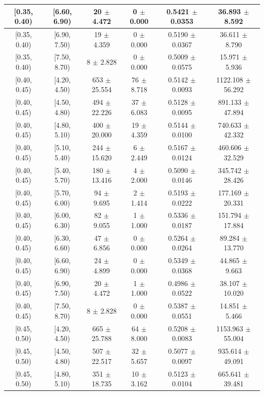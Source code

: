 \begin{longtable}{|c|c|c|c|c|c|}
\hline
[0.35, 0.40) & [6.60, 6.90) & 20 $\pm$ 4.472 & 0 $\pm$ 0.000 & 0.5421 $\pm$ 0.0353 & 36.893 $\pm$ 8.592 \\ 
\hline
[0.35, 0.40) & [6.90, 7.50) & 19 $\pm$ 4.359 & 0 $\pm$ 0.000 & 0.5190 $\pm$ 0.0367 & 36.611 $\pm$ 8.790 \\ 
\hline
[0.35, 0.40) & [7.50, 8.70) & 8 $\pm$ 2.828 & 0 $\pm$ 0.000 & 0.5009 $\pm$ 0.0575 & 15.971 $\pm$ 5.936 \\ 
\hline
[0.40, 0.45) & [4.20, 4.50) & 653 $\pm$ 25.554 & 76 $\pm$ 8.718 & 0.5142 $\pm$ 0.0093 & 1122.108 $\pm$ 56.292 \\ 
\hline
[0.40, 0.45) & [4.50, 4.80) & 494 $\pm$ 22.226 & 37 $\pm$ 6.083 & 0.5128 $\pm$ 0.0095 & 891.133 $\pm$ 47.894 \\ 
\hline
[0.40, 0.45) & [4.80, 5.10) & 400 $\pm$ 20.000 & 19 $\pm$ 4.359 & 0.5144 $\pm$ 0.0100 & 740.633 $\pm$ 42.332 \\ 
\hline
[0.40, 0.45) & [5.10, 5.40) & 244 $\pm$ 15.620 & 6 $\pm$ 2.449 & 0.5167 $\pm$ 0.0124 & 460.606 $\pm$ 32.529 \\ 
\hline
[0.40, 0.45) & [5.40, 5.70) & 180 $\pm$ 13.416 & 4 $\pm$ 2.000 & 0.5090 $\pm$ 0.0146 & 345.742 $\pm$ 28.426 \\ 
\hline
[0.40, 0.45) & [5.70, 6.00) & 94 $\pm$ 9.695 & 2 $\pm$ 1.414 & 0.5193 $\pm$ 0.0222 & 177.169 $\pm$ 20.331 \\ 
\hline
[0.40, 0.45) & [6.00, 6.30) & 82 $\pm$ 9.055 & 1 $\pm$ 1.000 & 0.5336 $\pm$ 0.0187 & 151.794 $\pm$ 17.884 \\ 
\hline
[0.40, 0.45) & [6.30, 6.60) & 47 $\pm$ 6.856 & 0 $\pm$ 0.000 & 0.5264 $\pm$ 0.0264 & 89.284 $\pm$ 13.770 \\ 
\hline
[0.40, 0.45) & [6.60, 6.90) & 24 $\pm$ 4.899 & 0 $\pm$ 0.000 & 0.5349 $\pm$ 0.0368 & 44.865 $\pm$ 9.663 \\ 
\hline
[0.40, 0.45) & [6.90, 7.50) & 20 $\pm$ 4.472 & 1 $\pm$ 1.000 & 0.4986 $\pm$ 0.0522 & 38.107 $\pm$ 10.020 \\ 
\hline
[0.40, 0.45) & [7.50, 8.70) & 8 $\pm$ 2.828 & 0 $\pm$ 0.000 & 0.5387 $\pm$ 0.0551 & 14.851 $\pm$ 5.466 \\ 
\hline
[0.45, 0.50) & [4.20, 4.50) & 665 $\pm$ 25.788 & 64 $\pm$ 8.000 & 0.5208 $\pm$ 0.0083 & 1153.963 $\pm$ 55.004 \\ 
\hline
[0.45, 0.50) & [4.50, 4.80) & 507 $\pm$ 22.517 & 32 $\pm$ 5.657 & 0.5077 $\pm$ 0.0097 & 935.614 $\pm$ 49.091 \\ 
\hline
[0.45, 0.50) & [4.80, 5.10) & 351 $\pm$ 18.735 & 10 $\pm$ 3.162 & 0.5123 $\pm$ 0.0104 & 665.641 $\pm$ 39.481 \\ 

\end{longtable}
